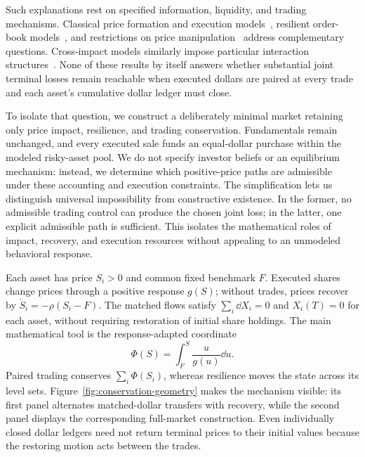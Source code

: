\documentclass[review,hidelinks,onefignum,onetabnum]{siamonline250211}
\begin{document}
Such explanations rest on specified information, liquidity, and trading mechanisms. Classical price formation and execution models~\citep{Kyle1985,AlmgrenChriss2001}, resilient order-book models~\citep{ObizhaevaWang2013,AlfonsiSchied2010,AlfonsiFruthSchied2010}, and restrictions on price manipulation~\citep{HubermanStanzl2004,Gatheral2010,AlfonsiSchiedSlynko2012,CuratoGatheralLillo2017} address complementary questions. Cross-impact models similarly impose particular interaction structures~\citep{AlfonsiKlockSchied2016,SchneiderLillo2019,BenzaquenEtAl2017,CordoniLillo2024}. None of these results by itself answers whether substantial joint terminal losses remain reachable when executed dollars are paired at every trade and each asset's cumulative dollar ledger must close.

To isolate that question, we construct a deliberately minimal market retaining only price impact, resilience, and trading conservation. Fundamentals remain unchanged, and every executed sale funds an equal-dollar purchase within the modeled risky-asset pool. We do not specify investor beliefs or an equilibrium mechanism: instead, we determine which positive-price paths are admissible under these accounting and execution constraints. The simplification lets us distinguish universal impossibility from constructive existence. In the former, no admissible trading control can produce the chosen joint loss; in the latter, one explicit admissible path is sufficient. This isolates the mathematical roles of impact, recovery, and execution resources without appealing to an unmodeled behavioral response.

Each asset has price $S_i>0$ and common fixed benchmark $F$. Executed shares change prices through a positive response $g(S)$; without trades, prices recover by $\dot S_i=-\rho(S_i-F)$. The matched flows satisfy $\sum_i\dd X_i=0$ and $X_i(T)=0$ for each asset, without requiring restoration of initial share holdings. The main mathematical tool is the response-adapted coordinate
\begin{equation}\label{eq:phi-intro}
\Phi(S)=\int_F^S\frac{u}{g(u)}\dd u.
\end{equation}
Paired trading conserves $\sum_i\Phi(S_i)$, whereas resilience moves the state across its level sets. Figure~\ref{fig:conservation-geometry} makes the mechanism visible: its first panel alternates matched-dollar transfers with recovery, while the second panel displays the corresponding full-market construction. Even individually closed dollar ledgers need not return terminal prices to their initial values because the restoring motion acts between the trades.
\end{document}
